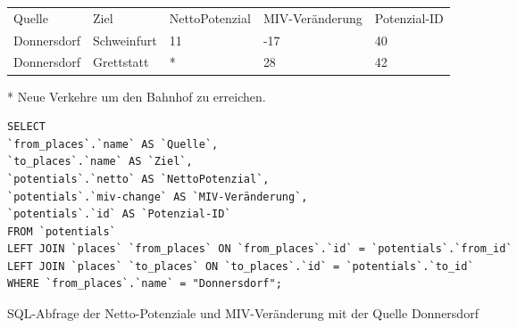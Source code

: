 \begin{tabularx}{\textwidth}{*5{X}}
Quelle & Ziel & NettoPotenzial & MIV-Veränderung & Potenzial-ID\\ 
Donnersdorf & Schweinfurt & 11 & -17 & 40\\ 
Donnersdorf & Grettstatt & * & 28 & 42\\ 
\end{tabularx}    
\newline
\newline
* Neue Verkehre um den Bahnhof zu erreichen.
\newline
\begin{listing}[htbp]
\begin{verbatim}
SELECT
`from_places`.`name` AS `Quelle`, 
`to_places`.`name` AS `Ziel`, 
`potentials`.`netto` AS `NettoPotenzial`, 
`potentials`.`miv-change` AS `MIV-Veränderung`, 
`potentials`.`id` AS `Potenzial-ID`
FROM `potentials`
LEFT JOIN `places` `from_places` ON `from_places`.`id` = `potentials`.`from_id`
LEFT JOIN `places` `to_places` ON `to_places`.`id` = `potentials`.`to_id`
WHERE `from_places`.`name` = "Donnersdorf";
\end{verbatim}
\caption{SQL-Abfrage der Netto-Potenziale und MIV-Veränderung mit der Quelle Donnersdorf}\label{lst-fz-donnersdorf}
\end{listing}
